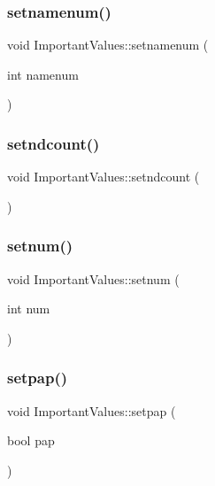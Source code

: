 \subsubsection{\texorpdfstring{setnamenum()}{setnamenum()}}
{\footnotesize\ttfamily void Important\+Values\+::setnamenum (\begin{DoxyParamCaption}\item[{int}]{namenum }\end{DoxyParamCaption})\hspace{0.3cm}{\ttfamily [inline]}}

\mbox{\label{class_important_values_aedfcf997adbff4e5ba00bc298f4116c7}} 
\subsubsection{\texorpdfstring{setndcount()}{setndcount()}}
{\footnotesize\ttfamily void Important\+Values\+::setndcount (\begin{DoxyParamCaption}{ }\end{DoxyParamCaption})\hspace{0.3cm}{\ttfamily [inline]}}

\mbox{\label{class_important_values_aa3287d6b468777bfd1187d055a9b6b4b}} 
\subsubsection{\texorpdfstring{setnum()}{setnum()}}
{\footnotesize\ttfamily void Important\+Values\+::setnum (\begin{DoxyParamCaption}\item[{int}]{num }\end{DoxyParamCaption})\hspace{0.3cm}{\ttfamily [inline]}}

\mbox{\label{class_important_values_aa4e578426fe4e1e77bc4ba6fc53cf2e1}} 
\subsubsection{\texorpdfstring{setpap()}{setpap()}}
{\footnotesize\ttfamily void Important\+Values\+::setpap (\begin{DoxyParamCaption}\item[{bool}]{pap }\end{DoxyParamCaption})\hspace{0.3cm}{\ttfamily [inline]}}

